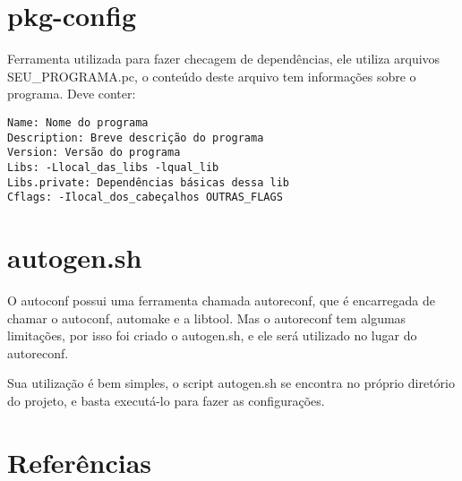 \documentclass[]{article}
\begin{document}
\section{pkg-config}
Ferramenta utilizada para fazer checagem de dependências, ele utiliza arquivos SEU\_PROGRAMA.pc, o conteúdo deste arquivo tem informações sobre o programa.
Deve conter:
\begin{verbatim}
Name: Nome do programa
Description: Breve descrição do programa
Version: Versão do programa
Libs: -Llocal_das_libs -lqual_lib
Libs.private: Dependências básicas dessa lib
Cflags: -Ilocal_dos_cabeçalhos OUTRAS_FLAGS
\end{verbatim}

\section{autogen.sh}
O autoconf possui uma ferramenta chamada autoreconf, que é encarregada de chamar o autoconf, automake e a libtool.
Mas o autoreconf tem algumas limitações, por isso foi criado o autogen.sh, e ele será utilizado no lugar do autoreconf.

Sua utilização é bem simples, o script autogen.sh se encontra no próprio diretório do projeto, e basta executá-lo para fazer as configurações.

\section{Referências}
\end{document}

